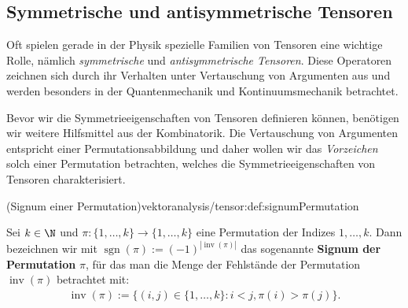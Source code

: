 \documentclass[letterpaper,10pt,english]{jupyterBook}
\begin{document}
\subsection{Symmetrische und antisymmetrische Tensoren}
\label{\detokenize{vektoranalysis/tensor:symmetrische-und-antisymmetrische-tensoren}}
\par
Oft spielen gerade in der Physik spezielle Familien von Tensoren eine wichtige Rolle, nämlich \emph{symmetrische} und \emph{antisymmetrische Tensoren}.
Diese Operatoren zeichnen sich durch ihr Verhalten unter Vertauschung von Argumenten aus und werden besonders in der Quantenmechanik und Kontinuumsmechanik betrachtet.

\par
Bevor wir die Symmetrieeigenschaften von Tensoren definieren können, benötigen wir weitere Hilfsmittel aus der Kombinatorik.
Die Vertauschung von Argumenten entspricht einer Permutationsabbildung und daher wollen wir das \emph{Vorzeichen} solch einer Permutation betrachten, welches die Symmetrieeigenschaften von Tensoren charakterisiert.
\begin{definition}{(Signum einer Permutation)}{vektoranalysis/tensor:def:signumPermutation}



\par
Sei \(k\in\N\) und \(\pi \colon \lbrace 1,\ldots, k\rbrace \rightarrow \lbrace 1,\ldots, k\rbrace\) eine Permutation der Indizes \(1,\ldots,k\).
Dann bezeichnen wir mit \(\operatorname{sgn}(\pi) := (-1)^{|\operatorname{inv}(\pi)|}\) das sogenannte \textbf{Signum der Permutation} \(\pi\), für das man die Menge der Fehlstände der Permutation \(\operatorname{inv}(\pi)\) betrachtet mit:
\begin{align*}
\operatorname{inv}(\pi) := \lbrace (i,j) \in \lbrace 1, \ldots, k \rbrace : i < j, \pi(i) > \pi(j) \rbrace.
\end{align*}\end{definition}
\end{document}
